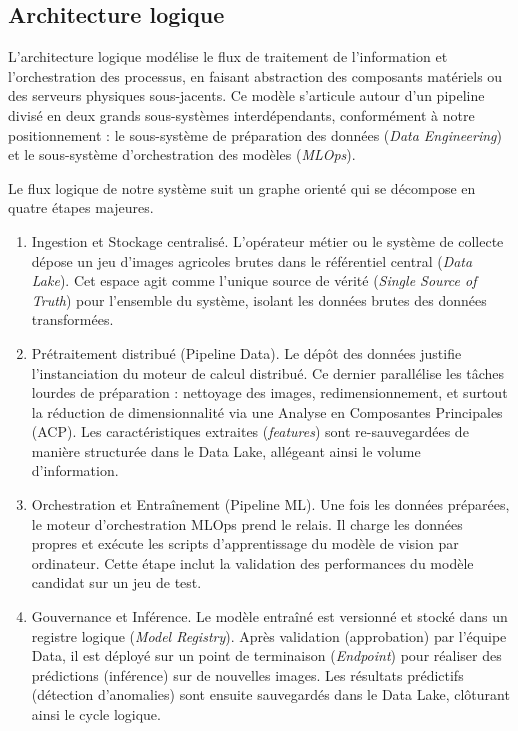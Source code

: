 \subsection{Architecture logique}
L'architecture logique modélise le flux de traitement de l'information et l'orchestration des processus, en faisant abstraction des composants matériels ou des serveurs physiques sous-jacents. Ce modèle s'articule autour d'un pipeline divisé en deux grands sous-systèmes interdépendants, conformément à notre positionnement : le sous-système de préparation des données (\textit{Data Engineering}) et le sous-système d'orchestration des modèles (\textit{MLOps}).

Le flux logique de notre système suit un graphe orienté qui se décompose en quatre étapes majeures.

\begin{enumerate}
    \item Ingestion et Stockage centralisé. L'opérateur métier ou le système de collecte dépose un jeu d'images agricoles brutes dans le référentiel central (\textit{Data Lake}). Cet espace agit comme l'unique source de vérité (\textit{Single Source of Truth}) pour l'ensemble du système, isolant les données brutes des données transformées.
    
    \item Prétraitement distribué (Pipeline Data). Le dépôt des données justifie l'instanciation du moteur de calcul distribué. Ce dernier parallélise les tâches lourdes de préparation : nettoyage des images, redimensionnement, et surtout la réduction de dimensionnalité via une Analyse en Composantes Principales (ACP). Les caractéristiques extraites (\textit{features}) sont re-sauvegardées de manière structurée dans le Data Lake, allégeant ainsi le volume d'information.
    
    \item Orchestration et Entraînement (Pipeline ML). Une fois les données préparées, le moteur d'orchestration MLOps prend le relais. Il charge les données propres et exécute les scripts d'apprentissage du modèle de vision par ordinateur. Cette étape inclut la validation des performances du modèle candidat sur un jeu de test.
    
    \item Gouvernance et Inférence. Le modèle entraîné est versionné et stocké dans un registre logique (\textit{Model Registry}). Après validation (approbation) par l'équipe Data, il est déployé sur un point de terminaison (\textit{Endpoint}) pour réaliser des prédictions (inférence) sur de nouvelles images. Les résultats prédictifs (détection d'anomalies) sont ensuite sauvegardés dans le Data Lake, clôturant ainsi le cycle logique.
\end{enumerate}

